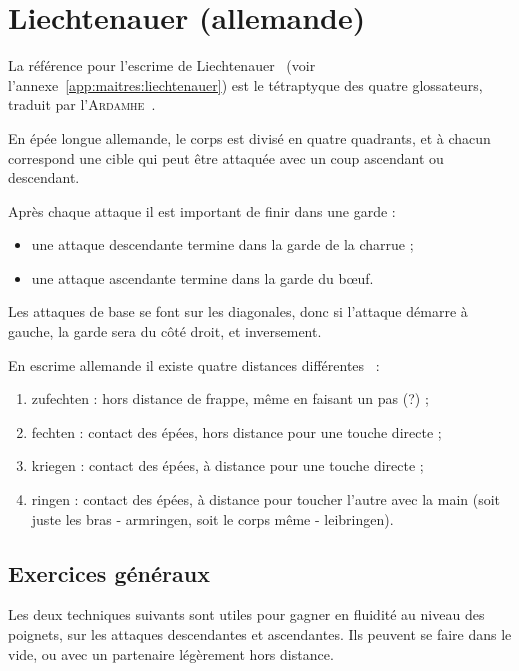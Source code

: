 \section{Liechtenauer (allemande)}
\label{sec:épée-longue:liechtenauer}

La référence pour l'escrime de Liechtenauer~\cite{wiktenauer:liechtenauer} (voir l'annexe~\ref{app:maitres:liechtenauer}) est le tétraptyque des quatre glossateurs, traduit par l'\textsc{Ardamhe}~\cite{ardamhe:tetraptyque}.

En épée longue allemande, le corps est divisé en quatre quadrants, et à chacun correspond une cible qui peut être attaquée avec un coup ascendant ou descendant.

Après chaque attaque il est important de finir dans une garde :
\begin{itemize}
	\item une attaque descendante termine dans la garde de la charrue ;
	\item une attaque ascendante termine dans la garde du bœuf.
\end{itemize}
Les attaques de base se font sur les diagonales, donc si l'attaque démarre à gauche, la garde sera du côté droit, et inversement.

En escrime allemande il existe quatre distances différentes~\cite{kronenburg:dijon:going_distance:2015} :
\begin{enumerate}
	\item zufechten : hors distance de frappe, même en faisant un pas (?) ;
	\item fechten : contact des épées, hors distance pour une touche directe ;
	\item kriegen : contact des épées, à distance pour une touche directe ;
	\item ringen : contact des épées, à distance pour toucher l'autre avec la main (soit juste les bras - armringen, soit le corps même - leibringen).
\end{enumerate}



\subsection{Exercices généraux}


Les deux techniques suivants sont utiles pour gagner en fluidité au niveau des poignets, sur les attaques descendantes et ascendantes. Ils peuvent se faire dans le vide, ou avec un partenaire légèrement hors distance.

